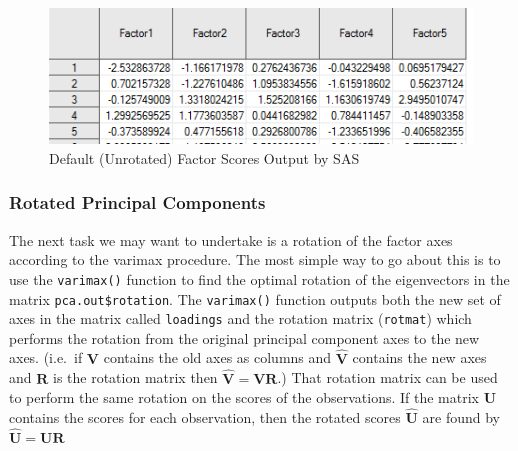 \documentclass[
]{article}
\newenvironment{Shaded}{\begin{snugshade}}{\end{snugshade}}
\newcommand{\CommentTok}[1]{\textcolor[rgb]{0.56,0.35,0.01}{\textit{#1}}}
\newcommand{\DecValTok}[1]{\textcolor[rgb]{0.00,0.00,0.81}{#1}}
\newcommand{\FunctionTok}[1]{\textcolor[rgb]{0.00,0.00,0.00}{#1}}
\newcommand{\NormalTok}[1]{#1}
\newcommand{\OtherTok}[1]{\textcolor[rgb]{0.56,0.35,0.01}{#1}}
\newcommand{\SpecialCharTok}[1]{\textcolor[rgb]{0.00,0.00,0.00}{#1}}
\theoremstyle{definition}
\theoremstyle{definition}
\theoremstyle{definition}
\theoremstyle{definition}
\theoremstyle{remark}
\begin{document}
\begin{figure}

{\centering \includegraphics[width=1\linewidth]{scoresOutput} 

}

\caption{Default (Unrotated) Factor Scores Output by SAS}\label{fig:unnamed-chunk-134}
\end{figure}

\hypertarget{rotated-principal-components}{%
\subsubsection{Rotated Principal Components}\label{rotated-principal-components}}

The next task we may want to undertake is a rotation of the factor axes according to the varimax procedure. The most simple way to go about this is to use the \texttt{varimax()} function to find the optimal rotation of the eigenvectors in the matrix \texttt{pca.out\$rotation}. The \texttt{varimax()} function outputs both the new set of axes in the matrix called \texttt{loadings} and the rotation matrix (\texttt{rotmat}) which performs the rotation from the original principal component axes to the new axes. (i.e.~if \(\textbf{V}\) contains the old axes as columns and \(\hat{\textbf{V}}\) contains the new axes and \(\textbf{R}\) is the rotation matrix then \(\hat{\textbf{V}} = \textbf{V}\textbf{R}\).) That rotation matrix can be used to perform the same rotation on the scores of the observations. If the matrix \(\textbf{U}\) contains the scores for each observation, then the rotated scores \(\hat{\textbf{U}}\) are found by \(\hat{\textbf{U}} = \textbf{U}\textbf{R}\)

\begin{Shaded}
\end{Shaded}
\end{document}

